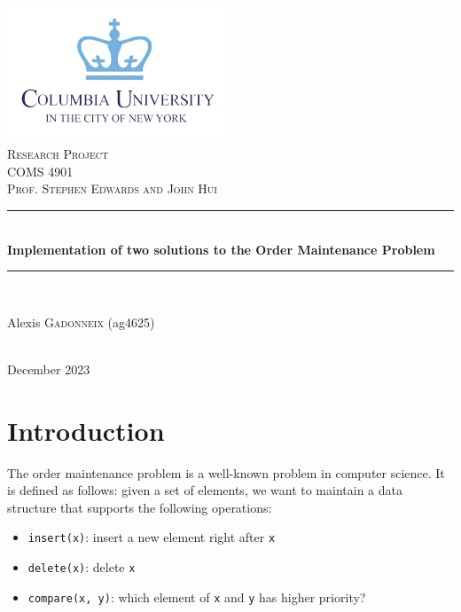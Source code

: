 \documentclass[12pt]{article}
\begin{document}
\begin{titlepage}

  \newcommand{\HRule}{\rule{\linewidth}{0.5mm}}

  \center

  \includegraphics[width=250px, keepaspectratio]{./columbia-logo.png}\\[1cm]
  \textsc{\Large Research Project}\\[0.5cm]
  \textsc{\large COMS 4901}\\[0.3cm]
  \textsc{\large Prof. Stephen Edwards and John Hui}\\[0.5cm]

  \HRule \\[0.4cm]
  { \huge \bfseries Implementation of two solutions to the Order Maintenance Problem}\\[0.4cm]
  \HRule \\[1.5cm]

  \begin{minipage}{0.4\textwidth}
    \begin{center} \large
      Alexis \textsc{Gadonneix} (ag4625)\\
    \end{center}

  \end{minipage}\\[2cm]

  {\large December 2023}\\[2cm]

  \vfill

\end{titlepage}


\section{Introduction}

The order maintenance problem is a well-known problem in computer science. It is defined as follows: given a set of elements, we want to maintain a data structure that supports the following operations:
\begin{itemize}
  \item \texttt{insert(x)}: insert a new element right after \texttt{x}
  \item \texttt{delete(x)}: delete \texttt{x}
  \item \texttt{compare(x, y)}: which element of \texttt{x} and \texttt{y} has higher priority?
\end{itemize}
\end{document}
